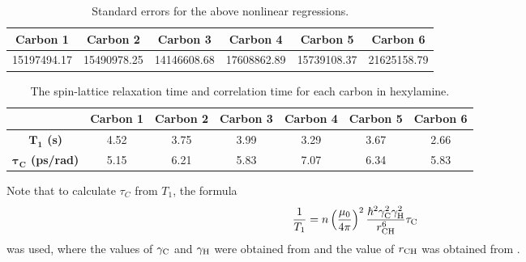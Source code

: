 \documentclass[../labs.tex]{subfiles}
\begin{document}
\begin{table}[H]
    \centering
    \small
    \renewcommand{\arraystretch}{1.2}
    \begin{tabular}{|c|c|c|c|c|c|}
        \hline
        \textbf{Carbon 1} & \textbf{Carbon 2} & \textbf{Carbon 3} & \textbf{Carbon 4} & \textbf{Carbon 5} & \textbf{Carbon 6}\\
        \hline
        \num{15197494.17} & \num{15490978.25} & \num{14146608.68} & \num{17608862.89} & \num{15739108.37} & \num{21625158.79}\\
        \hline
    \end{tabular}
    \caption{Standard errors for the above nonlinear regressions.}
    \label{fig:NMRse}
\end{table}

\begin{table}[H]
    \centering
    \small
    \renewcommand{\arraystretch}{1.2}
    \begin{tabular}{|c|c|c|c|c|c|c|}
        \hline
         & \textbf{Carbon 1} & \textbf{Carbon 2} & \textbf{Carbon 3} & \textbf{Carbon 4} & \textbf{Carbon 5} & \textbf{Carbon 6}\\
        \hline
        \textbf{$\bm{T_1}$ (s)} & \num{4.52} & \num{3.75} & \num{3.99} & \num{3.29} & \num{3.67} & \num{2.66}\\ \hline
        \textbf{$\bm{\tau_C^{}}$ (ps/rad)} & \num{5.15} & \num{6.21} & \num{5.83} & \num{7.07} & \num{6.34} & \num{5.83}\\
        \hline
    \end{tabular}
    \caption{The spin-lattice relaxation time and correlation time for each carbon in hexylamine.}
    \label{tab:T1tC}
\end{table}
Note that to calculate $\tau_C$ from $T_1$, the formula
\begin{equation*}
    \frac{1}{T_1} = n\left( \frac{\mu_0}{4\pi} \right)^2\frac{\hbar^2\gamma_{\ce{C}}^2\gamma_{\ce{H}}^2}{r_{\ce{CH}}^6}\tau_{\ce{C}}
\end{equation*}
was used, where the values of $\gamma_{\ce{C}}$ and $\gamma_{\ce{H}}$ were obtained from \textcite{bib:C13H1gyro} and the value of $r_{\ce{CH}}$ was obtained from \textcite{bib:CRCHandbook}.\par\medskip
\end{document}
